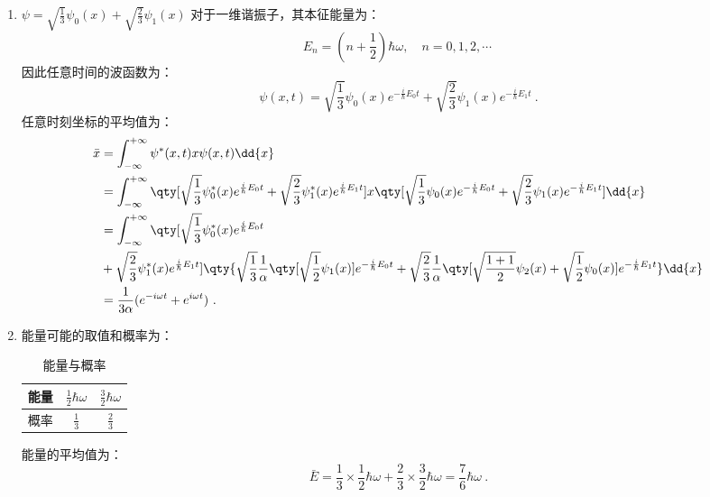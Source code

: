 \subsection{ }
\begin{enumerate}
\item $\psi=\sqrt{\frac{1}{3}}\psi_{0}(x)+\sqrt{\frac{2}{3}}\psi_{1}(x)$
对于一维谐振子，其本征能量为：
\begin{equation}
E_{n}=(n+\frac{1}{2})\hbar \omega,\quad n=0,1,2,\cdots~
\end{equation}
因此任意时间的波函数为：
\begin{equation}
\psi(x,t)=\sqrt{\frac{1}{3}}\psi_{0}(x)e^{-\frac{i}{\hbar}E_{0}t}+\sqrt{\frac{2}{3}}\psi_{1}(x)e^{-\frac{i}{\hbar}E_{1}t}~.
\end{equation}
任意时刻坐标的平均值为：
\begin{equation}
\begin{aligned}
\bar{x}&=\int^{+\infty}_{-\infty}\psi^{*}(x,t)x\psi(x,t)\dd{x} \\
&=\int^{+\infty}_{-\infty} \qty[\sqrt{\frac{1}{3}}\psi^{*}_{0}(x)e^{\frac{i}{\hbar}E_{0}t}+\sqrt{\frac{2}{3}}\psi^{*}_{1}(x)e^{\frac{i}{\hbar}E_{1}t}]x\qty[\sqrt{\frac{1}{3}}\psi_{0}(x)e^{-\frac{i}{\hbar}E_{0}t}+\sqrt{\frac{2}{3}}\psi_{1}(x)e^{-\frac{i}{\hbar}E_{1}t}]\dd{x} \\
&=\int^{+\infty}_{-\infty} \qty[\sqrt{\frac{1}{3}}\psi^{*}_{0}(x)e^{\frac{i}{\hbar}E_{0}t}\\
&+\sqrt{\frac{2}{3}}\psi^{*}_{1}(x)e^{\frac{i}{\hbar}E_{1}t}]\qty{\sqrt{\frac{1}{3}}\frac{1}{\alpha}\qty[\sqrt{\frac{1}{2}}\psi_{1}(x)]e^{-\frac{i}{\hbar}E_{0}t}+\sqrt{\frac{2}{3}}\frac{1}{\alpha}\qty[\sqrt{\frac{1+1}{2}}\psi_{2}(x)+\sqrt{\frac{1}{2}}\psi_{0}(x)]e^{-\frac{i}{\hbar}E_{1}t}}\dd{x} \\
&=\frac{1}{3\alpha}(e^{-i\omega t}+e^{i\omega t})~.
\end{aligned}
\end{equation}

\item 能量可能的取值和概率为：
\begin{table}[ht]
\centering
\caption{能量与概率}\label{tab_TJU14A_2}
\begin{tabular}{|c|c|c|}
\hline
能量 & $\frac{1}{2}\hbar\omega$ & $\frac{3}{2}\hbar\omega$ \\
\hline
概率 & $\frac{1}{3}$ & $\frac{2}{3}$ \\
\hline
\end{tabular}
\end{table}
能量的平均值为：
\begin{equation}
\bar{E}=\frac{1}{3}\times \frac{1}{2}\hbar\omega + \frac{2}{3}\times \frac{3}{2}\hbar\omega=\frac{7}{6}\hbar\omega~.
\end{equation}
\end{enumerate}
